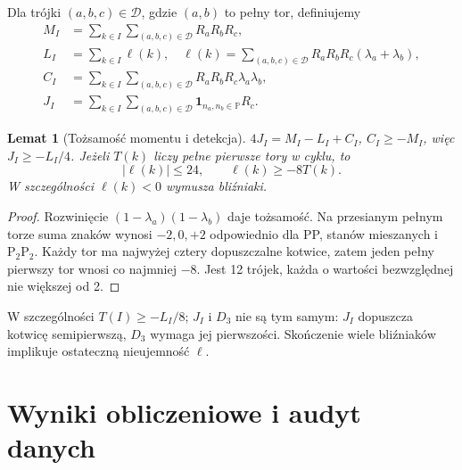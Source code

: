 \documentclass[11pt,a4paper]{article}
\newtheorem{lem}[tw]{Lemat}
\theoremstyle{definition}\newtheorem{defn}[tw]{Definicja}
\theoremstyle{remark}\newtheorem*{uw}{Uwaga}
\newcommand{\Pp}{\mathbb P}
\newcommand{\one}{\mathbf1}
\newcommand{\D}{\mathcal D}
\newcommand{\Ptwo}{\mathrm{P}_2}
\begin{document}
Dla trójki $(a,b,c)\in\D$, gdzie $(a,b)$ to pełny tor, definiujemy
\begin{align*}
 M_I&=\sum_{k\in I}\sum_{(a,b,c)\in\D}R_aR_bR_c,\\
 L_I&=\sum_{k\in I}\ell(k),\quad
 \ell(k)=\sum_{(a,b,c)\in\D}R_aR_bR_c(\lambda_a+\lambda_b),\\
 C_I&=\sum_{k\in I}\sum_{(a,b,c)\in\D}R_aR_bR_c\lambda_a\lambda_b,\\
 J_I&=\sum_{k\in I}\sum_{(a,b,c)\in\D}\one_{n_a,n_b\in\Pp}R_c.
\end{align*}
\begin{lem}[Tożsamość momentu i detekcja]\label{lem:sign}
$4J_I=M_I-L_I+C_I$, $C_I\ge-M_I$, więc $J_I\ge-L_I/4$.
Jeżeli $T(k)$ liczy pełne pierwsze tory w cyklu, to
\[
 |\ell(k)|\le24,\qquad \ell(k)\ge-8T(k).
\]
W szczególności $\ell(k)<0$ wymusza bliźniaki.
\end{lem}
\begin{proof}
Rozwinięcie $(1-\lambda_a)(1-\lambda_b)$ daje tożsamość. Na przesianym
pełnym torze suma znaków wynosi $-2,0,+2$ odpowiednio dla PP, stanów mieszanych
i $\Ptwo\Ptwo$. Każdy tor ma najwyżej cztery dopuszczalne kotwice, zatem
jeden pełny pierwszy tor wnosi co najmniej $-8$. Jest 12 trójek, każda o
wartości bezwzględnej nie większej od 2.
\end{proof}
W szczególności $T(I)\ge-L_I/8$; $J_I$ i $D_3$ nie są tym samym:
$J_I$ dopuszcza kotwicę semipierwszą, $D_3$ wymaga jej pierwszości.
Skończenie wiele bliźniaków implikuje ostateczną nieujemność $\ell$.

\section{Wyniki obliczeniowe i audyt danych}
\end{document}
